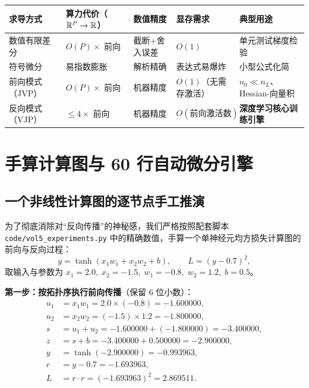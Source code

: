 \begin{center}
\small
\begin{tabularx}{\linewidth}{@{}p{26mm}p{26mm}p{24mm}p{26mm}X@{}}
\toprule
\textbf{求导方式} & \textbf{算力代价（$\mathbb{R}^P \to \mathbb{R}$）} & \textbf{数值精度} & \textbf{显存需求} & \textbf{典型用途} \\
\midrule
数值有限差分 & $O(P) \times$ 前向 & 截断+舍入误差 & $O(1)$ & 单元测试梯度检验 \\
符号微分 & 易指数膨胀 & 解析精确 & 表达式易爆炸 & 小型公式化简 \\
前向模式（JVP） & $O(P) \times$ 前向 & 机器精度 & $O(1)$（无需存激活） & $n_0 \ll n_L$、Hessian-向量积 \\
反向模式（VJP） & $\le 4 \times$ 前向 & 机器精度 & $O(\text{前向激活数})$ & \textbf{深度学习核心训练引擎} \\
\bottomrule
\end{tabularx}
\end{center}

\section{手算计算图与 60 行自动微分引擎}
\label{sec:micrograd}

\subsection{一个非线性计算图的逐节点手工推演}

为了彻底消除对“反向传播”的神秘感，我们严格按照配套脚本 \texttt{code/vol5\_experiments.py} 中的精确数值，手算一个单神经元均方损失计算图的前向与反向过程：
\[
  y = \tanh(x_1 w_1 + x_2 w_2 + b), \qquad L = (y - 0.7)^2,
\]
取输入与参数为 $x_1 = 2.0,\; x_2 = -1.5,\; w_1 = -0.8,\; w_2 = 1.2,\; b = 0.5$。

\textbf{第一步：按拓扑序执行前向传播}（保留 6 位小数）：
\begin{align*}
  u_1 &= x_1 w_1 = 2.0 \times (-0.8) = -1.600000, \\
  u_2 &= x_2 w_2 = (-1.5) \times 1.2 = -1.800000, \\
  s   &= u_1 + u_2 = -1.600000 + (-1.800000) = -3.400000, \\
  z   &= s + b = -3.400000 + 0.500000 = -2.900000, \\
  y   &= \tanh(-2.900000) = -0.993963, \\
  r   &= y - 0.7 = -1.693963, \\
  L   &= r \cdot r = (-1.693963)^2 = 2.869511.
\end{align*}

